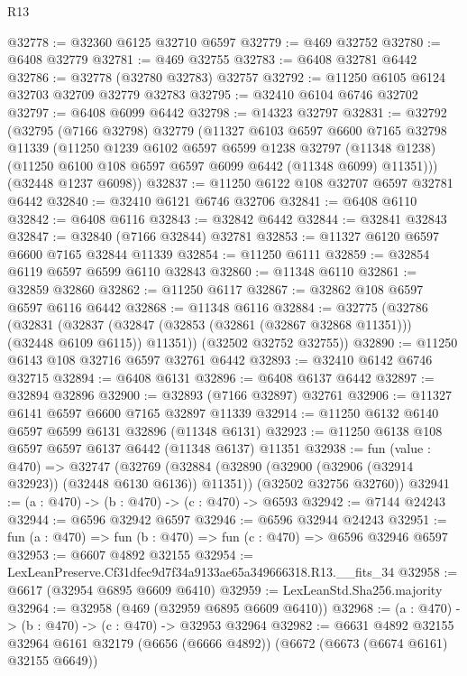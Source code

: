 \begin{lexlean}{R13}
\begin{coremodule}
@32778 := @32360 @6125 @32710 @6597
@32779 := @469 @32752
@32780 := @6408 @32779
@32781 := @469 @32755
@32783 := @6408 @32781 @6442
@32786 := @32778 (@32780 @32783) @32757
@32792 := @11250 @6105 @6124 @32703 @32709 @32779 @32783
@32795 := @32410 @6104 @6746 @32702
@32797 := @6408 @6099 @6442
@32798 := @14323 @32797
@32831 := @32792
    (@32795
      (@7166 @32798)
      @32779
      (@11327
        @6103
        @6597
        @6600
        @7165
        @32798
        @11339
        (@11250
          @1239
          @6102
          @6597
          @6599
          @1238
          @32797
          (@11348 @1238)
          (@11250 @6100 @108 @6597 @6597 @6099 @6442 (@11348 @6099) @11351)))
      (@32448 @1237 @6098))
@32837 := @11250 @6122 @108 @32707 @6597 @32781 @6442
@32840 := @32410 @6121 @6746 @32706
@32841 := @6408 @6110
@32842 := @6408 @6116
@32843 := @32842 @6442
@32844 := @32841 @32843
@32847 := @32840 (@7166 @32844) @32781
@32853 := @11327 @6120 @6597 @6600 @7165 @32844 @11339
@32854 := @11250 @6111
@32859 := @32854 @6119 @6597 @6599 @6110 @32843
@32860 := @11348 @6110
@32861 := @32859 @32860
@32862 := @11250 @6117
@32867 := @32862 @108 @6597 @6597 @6116 @6442
@32868 := @11348 @6116
@32884 := @32775
    (@32786
      (@32831
        (@32837 (@32847 (@32853 (@32861 (@32867 @32868 @11351))) (@32448 @6109 @6115)) @11351))
      (@32502 @32752 @32755))
@32890 := @11250 @6143 @108 @32716 @6597 @32761 @6442
@32893 := @32410 @6142 @6746 @32715
@32894 := @6408 @6131
@32896 := @6408 @6137 @6442
@32897 := @32894 @32896
@32900 := @32893 (@7166 @32897) @32761
@32906 := @11327 @6141 @6597 @6600 @7165 @32897 @11339
@32914 := @11250 @6132 @6140 @6597 @6599 @6131 @32896 (@11348 @6131)
@32923 := @11250 @6138 @108 @6597 @6597 @6137 @6442 (@11348 @6137) @11351
@32938 := fun (value : @470) =>
  @32747
    (@32769
      (@32884 (@32890 (@32900 (@32906 (@32914 @32923)) (@32448 @6130 @6136)) @11351))
      (@32502 @32756 @32760))
@32941 := (a : @470) -> (b : @470) -> (c : @470) -> @6593
@32942 := @7144 @24243
@32944 := @6596 @32942 @6597
@32946 := @6596 @32944 @24243
@32951 := fun (a : @470) => fun (b : @470) => fun (c : @470) => @6596 @32946 @6597
@32953 := @6607 @4892 @32155
@32954 := LexLeanPreserve.Cf31dfec9d7f34a9133ae65a349666318.R13.__fits_34
@32958 := @6617 (@32954 @6895 @6609 @6410)
@32959 := LexLeanStd.Sha256.majority
@32964 := @32958 (@469 (@32959 @6895 @6609 @6410))
@32968 := (a : @470) -> (b : @470) -> (c : @470) -> @32953 @32964
@32982 := @6631
    @4892
    @32155
    @32964
    @6161
    @32179
    (@6656 (@6666 @4892))
    (@6672 (@6673 (@6674 @6161) @32155 @6649))

\end{coremodule}
\end{lexlean}
